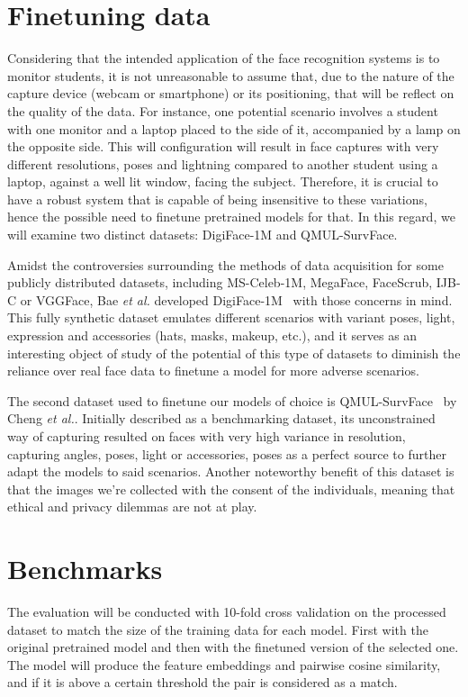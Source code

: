 \documentclass[class=report, crop=false, a4paper, 12pt]{standalone}
\begin{document}
\section{Finetuning data}
Considering that the intended application of the face recognition systems is to monitor students, it is not unreasonable to assume that, due to the nature of the capture device (webcam or smartphone) or its positioning, that will be reflect on the quality of the data. For instance, one potential scenario involves a student with one monitor and a laptop placed to the side of it, accompanied by a lamp on the opposite side. This will configuration will result in face captures with very different resolutions, poses and lightning compared to another student using a laptop, against a well lit window, facing the subject. Therefore, it is crucial to have a robust system that is capable of being insensitive to these variations, hence the possible need to finetune pretrained models for that. In this regard, we will examine two distinct datasets: DigiFace-1M and QMUL-SurvFace.
\par Amidst the controversies surrounding the methods of data acquisition for some publicly distributed datasets, including MS-Celeb-1M, MegaFace, FaceScrub, IJB-C or VGGFace, Bae \textit{et al.} developed DigiFace-1M~\autocite{baeDigiFace1MMillionDigital2023} with those concerns in mind. This fully synthetic dataset emulates different scenarios with variant poses, light, expression and accessories (hats, masks, makeup, etc.), and it serves as an interesting object of study of the potential of this type of datasets to diminish the reliance over real face data to finetune a model for more adverse scenarios.
\par The second dataset used to finetune our models of choice is QMUL-SurvFace~\autocite{chengSurveillanceFaceRecognition2018} by Cheng \textit{et al.}. Initially described as a benchmarking dataset, its unconstrained way of capturing resulted on faces with very high variance in resolution, capturing angles, poses, light or accessories, poses as a perfect source to further adapt the models to said scenarios. Another noteworthy benefit of this dataset is that the images we're collected with the consent of the individuals, meaning that ethical and privacy dilemmas are not at play.

\section{Benchmarks}
\par The evaluation will be conducted with 10-fold cross validation on the processed dataset to match the size of the training data for each model. First with the original pretrained model and then with the finetuned version of the selected one. The model will produce the feature embeddings and pairwise cosine similarity, and if it is above a certain threshold the pair is considered as a match. 
\end{document}
